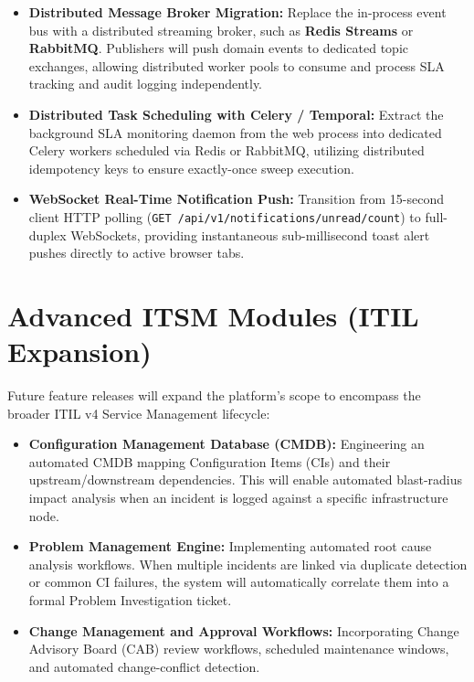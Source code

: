 \documentclass[11pt,a4paper,oneside]{report}
\begin{document}
\begin{itemize}
    \item \textbf{Distributed Message Broker Migration:} Replace the in-process event bus with a distributed streaming broker, such as \textbf{Redis Streams} or \textbf{RabbitMQ}. Publishers will push domain events to dedicated topic exchanges, allowing distributed worker pools to consume and process SLA tracking and audit logging independently.
    \item \textbf{Distributed Task Scheduling with Celery / Temporal:} Extract the background SLA monitoring daemon from the web process into dedicated Celery workers scheduled via Redis or RabbitMQ, utilizing distributed idempotency keys to ensure exactly-once sweep execution.
    \item \textbf{WebSocket Real-Time Notification Push:} Transition from 15-second client HTTP polling (\texttt{GET /api/v1/notifications/unread/count}) to full-duplex WebSockets, providing instantaneous sub-millisecond toast alert pushes directly to active browser tabs.
\end{itemize}

\section{Advanced ITSM Modules (ITIL Expansion)}
\label{sec:future_itil}
Future feature releases will expand the platform's scope to encompass the broader ITIL v4 Service Management lifecycle:
\begin{itemize}
    \item \textbf{Configuration Management Database (CMDB):} Engineering an automated CMDB mapping Configuration Items (CIs) and their upstream/downstream dependencies. This will enable automated blast-radius impact analysis when an incident is logged against a specific infrastructure node.
    \item \textbf{Problem Management Engine:} Implementing automated root cause analysis workflows. When multiple incidents are linked via duplicate detection or common CI failures, the system will automatically correlate them into a formal Problem Investigation ticket.
    \item \textbf{Change Management and Approval Workflows:} Incorporating Change Advisory Board (CAB) review workflows, scheduled maintenance windows, and automated change-conflict detection.
\end{itemize}
\end{document}
